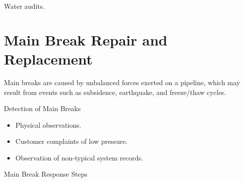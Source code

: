 \documentclass[10pt]{article}
\begin{document}
Water audits.

\section{Main Break Repair and Replacement}
Main breaks are caused by unbalanced forces exerted on a pipeline, which may result from events such as subsidence, earthquake, and freeze/thaw cycles.

Detection of Main Breaks

\begin{itemize}
  \item Physical observations.

  \item Customer complaints of low pressure.

  \item Observation of non-typical system records.

\end{itemize}
Main Break Response Steps
\end{document}
